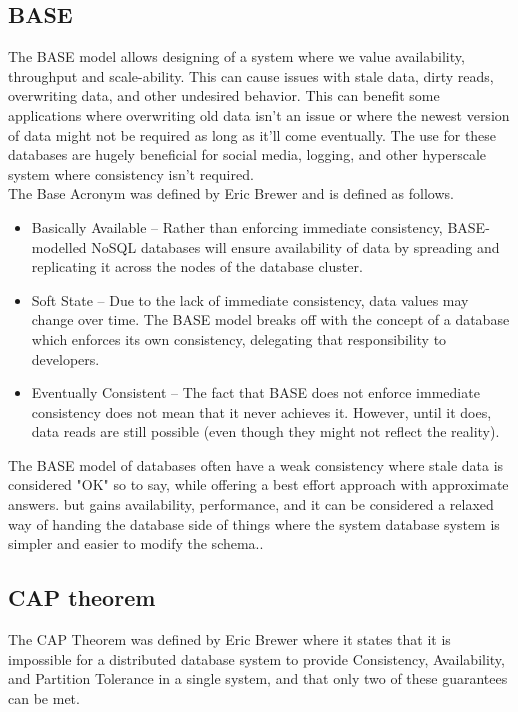 \documentclass[a4paper,10pt,titlepage]{report}
\begin{document}
\subsection{BASE}
The BASE model allows designing of a system where we value availability, throughput and scale-ability. This can cause issues with stale data, dirty reads, overwriting data, and other undesired behavior. This can benefit some applications where overwriting old data isn't an issue or where the newest version of data might not be required as long as it'll come eventually. The use for these databases are hugely beneficial for social media, logging, and other hyperscale system where consistency isn't required.\\
\vspace{5mm}
The Base Acronym was defined by Eric Brewer\cite{brewer2000towards} and is defined as follows.

\begin{itemize}
    \item Basically Available – Rather than enforcing immediate consistency, BASE-modelled NoSQL databases will ensure availability of data by spreading and replicating it across the nodes of the database cluster.
    \item Soft State – Due to the lack of immediate consistency, data values may change over time. The BASE model breaks off with the concept of a database which enforces its own consistency, delegating that responsibility to developers.
    \item Eventually Consistent – The fact that BASE does not enforce immediate consistency does not mean that it never achieves it. However, until it does, data reads are still possible (even though they might not reflect the reality).
\end{itemize}

The BASE model of databases often have a weak consistency where stale data is considered "OK" so to say, while offering a best effort approach with approximate answers. but gains availability, performance, and it can be considered a relaxed way of handing the database side of things where the system database system is simpler and easier to modify the schema..

\subsection{CAP theorem}

The CAP Theorem was defined by Eric Brewer\cite{CAP} where it states that it is impossible for a distributed database system to provide Consistency, Availability, and Partition Tolerance in a single system, and that only two of these guarantees can be met.\\
\end{document}
